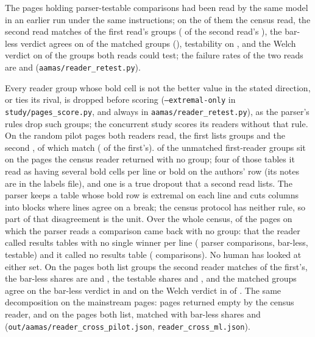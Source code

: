 \documentclass[sigconf,anonymous]{aamas}
\begin{document}
The \nTpPages{} pages holding parser-testable comparisons had been read by
the same model in an earlier run under the same instructions; on the
\nRtPages{} of them the census read, the second
read matches \nRtMatchedCi{} of the first read's \nRtGroupsFirst{} groups
(\nRtMatchedOfSecondPct{} of the second read's \nRtGroupsSecond{}), the
bar-less verdict agrees on \nRtNeitherAgree{} of the \nRtMatched{} matched
groups (\nRtNeitherAgreePct{}), testability on \nRtTestableAgreePct{}, and
the Welch verdict on \nRtFailAgree{} of the \nRtBothTested{} groups both
reads could test; the failure rates of the two reads are \nRtFailFirst{}
and \nRtFailSecond{} (\texttt{aamas/reader\_retest.py}).

Every reader group whose bold cell is not the better value in the
stated direction, or ties its rival, is dropped before scoring
(\texttt{--extremal-only} in \texttt{study/pages\_score.py}, and always
in \texttt{aamas/reader\_retest.py}), as the parser's rules drop such
groups; the concurrent study scores its readers without that rule.
On the \nCcrPages{} random pilot pages both readers read, the first lists
\nCcrFirstGroups{} groups and the second \nCcrSecondGroups{}, \nCcrMatched{}
of which match (\nCcrMatchedPct{} of the first's).
\nCcrUnmatchedOnEmptyPages{} of the \nCcrFirstUnmatched{} unmatched
first-reader groups sit on the \nCcrPagesSecondEmpty{} pages the census
reader returned with no group; four of those tables it read as having
several bold cells per line or bold on the authors' row (its notes are in
the labels file), and one is a true dropout that a second read lists. The
parser keeps a table whose bold row is extremal on each line and cuts
columns into blocks where lines agree on a break; the census protocol
has neither rule, so part of that disagreement is the unit. Over the
whole census, \nEcPages{} of the \nEcParserPages{} pages on which the
parser reads a comparison came back with no group: \nEcNonePages{} that
the reader called results tables with no single winner per line
(\nEcNoneComparisons{} parser comparisons, \nEcNoneNeither{} bar-less,
\nEcNoneTestable{} testable) and \nEcNotablePages{} it called no results
table (\nEcNotableComparisons{} comparisons). No human has looked at
either set. On the \nCcrSharedPages{} pages both list groups the second reader
matches \nCcrSharedMatchedPct{} of the first's, the bar-less shares are
\nCcrSharedFirstNeither{} and \nCcrSharedSecondNeither{}, the testable
shares \nCcrSharedFirstTestable{} and \nCcrSharedSecondTestable{}, and
the matched groups agree on the bar-less verdict in
\nCcrSharedNeitherAgreePct{} and on the Welch verdict in
\nCcrSharedFailAgree{} of \nCcrSharedBothTested{}. The same decomposition
on the \nMsPages{} mainstream pages: \nMsCrossPagesSecondEmpty{} pages
returned empty by the census reader, and on the \nMsCrossSharedPages{}
pages both list, \nMsCrossSharedMatchedPct{} matched with bar-less shares
\nMsCrossSharedFirstNeither{} and \nMsCrossSharedSecondNeither{}
(\texttt{out/aamas/reader\_cross\_pilot.json}, \texttt{reader\_cross\_ml.json}).
{\scriptsize}
\end{document}
